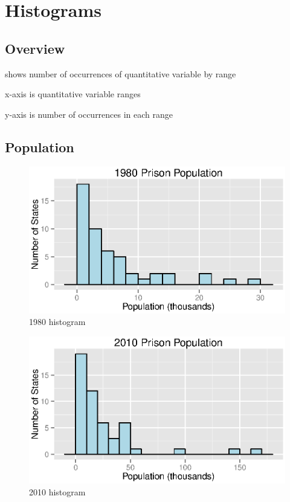 \documentclass{exam}
\begin{document}
  \section{Histograms}

  \subsection{Overview}
  \begin{itemize*}
    \item shows number of occurrences of quantitative variable by range
    \item x-axis is quantitative variable ranges
    \item y-axis is number of occurrences in each range
  \end{itemize*}

  \subsection{Population}

  \begin{figure}[H]
    \centering
    \includegraphics[scale = 0.9]{figures/population_histogram_1980.eps}
    \caption{1980 histogram}
  \end{figure}

  \begin{figure}[H]
    \centering
    \includegraphics[scale = 0.9]{figures/population_histogram_2010.eps}
    \caption{2010 histogram}
  \end{figure}
\end{document}
